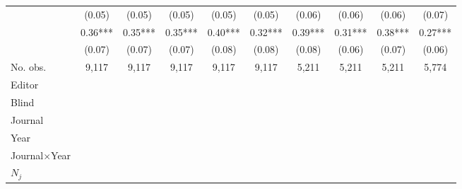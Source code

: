 \begin{table}
\begin{threeparttable}
\begin{tabular}{p{3cm}S@{}S@{}S@{}S@{}S@{}S@{}S@{}S@{}S@{}}
                                          &      (0.05)   &      (0.05)   &      (0.05)   &      (0.05)   &      (0.05)   &      (0.06)   &      (0.06)   &      (0.06)   &      (0.07)   \\
            &        0.36***&        0.35***&        0.35***&        0.40***&        0.32***&        0.39***&        0.31***&        0.38***&        0.27***\\
                                          &      (0.07)   &      (0.07)   &      (0.07)   &      (0.08)   &      (0.08)   &      (0.08)   &      (0.06)   &      (0.07)   &      (0.06)   \\
            \midrule
            No. obs.                      &       9,117   &       9,117   &       9,117   &       9,117   &       9,117   &       5,211   &       5,211   &       5,211   &       5,774   \\
            \midrule
            Editor                &           {}   &           {}   &           {}   &           {}   &           {}   &           {}   &           {}   &           {}   &           {}   \\
            Blind                         &           {}   &           {}   &           {}   &           {}   &           {}   &           {}   &           {}   &           {}   &           {}   \\
            Journal                       &           {}   &           {}   &               &               &               &               &               &               &               \\
            Year                          &               &           {}   &               &               &               &               &               &               &               \\
            Journal\(\times\)Year                  &               &               &           {}   &           {}   &           {}   &           {}   &           {}   &           {}   &           {}   \\
            \(N_j\)                       &               &               &               &           {}   &           {}   &           {}   &           {}   &           {}   &           {}   \\

\end{tabular}
\end{threeparttable}
\end{table}
